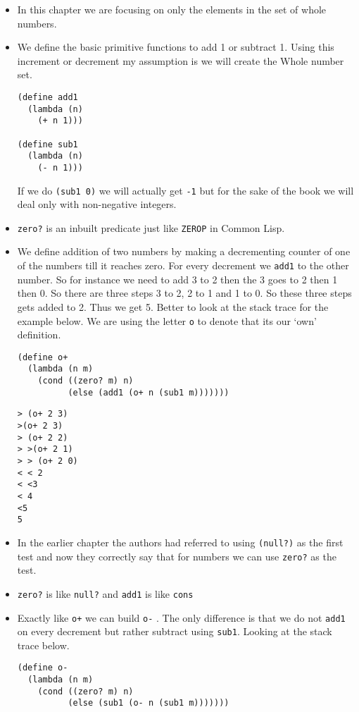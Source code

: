 \documentclass[11pt]{article}
\begin{document}
\begin{itemize}
\item In this chapter we are focusing on only the elements in the set of whole numbers.
\item We define the basic primitive functions to add 1 or subtract 1. Using this increment or decrement my assumption is we will create the Whole
number set.
\begin{verbatim}
(define add1
  (lambda (n)
    (+ n 1)))

(define sub1
  (lambda (n)
    (- n 1)))

\end{verbatim}
If we do \texttt{(sub1 0)} we will actually get \texttt{-1} but for the sake of the book we will deal only with non-negative integers.
\item \texttt{zero?} is an inbuilt predicate just like \texttt{ZEROP} in Common Lisp.
\item We define addition of two numbers by making a decrementing counter of one of the numbers till it reaches zero. For every decrement we \texttt{add1}
to the other number. So for instance we need to add 3 to 2 then the 3 goes to 2 then 1 then 0. So there are three steps 3 to 2, 2 to 1 and 1
to 0. So these three steps gets added to 2. Thus we get 5. Better to look at the stack trace for the example below. We are using the letter \texttt{o}
to denote that its our `own' definition.
\begin{verbatim}
(define o+
  (lambda (n m)
    (cond ((zero? m) n)
          (else (add1 (o+ n (sub1 m)))))))

\end{verbatim}

\begin{verbatim}
> (o+ 2 3)
>(o+ 2 3)
> (o+ 2 2)
> >(o+ 2 1)
> > (o+ 2 0)
< < 2
< <3
< 4
<5
5

\end{verbatim}

\item In the earlier chapter the authors had referred to using \texttt{(null?)} as the first test and now they correctly say that for numbers we can
use \texttt{zero?} as the test.
\item \texttt{zero?} is like \texttt{null?} and \texttt{add1} is like \texttt{cons}
\item Exactly like \texttt{o+} we can build \texttt{o-} . The only difference is that we do not \texttt{add1} on every decrement but rather subtract using \texttt{sub1}. Looking
at the stack trace below.
\begin{verbatim}
(define o-
  (lambda (n m)
    (cond ((zero? m) n)
          (else (sub1 (o- n (sub1 m)))))))


\end{verbatim}
\end{itemize}
\end{document}
